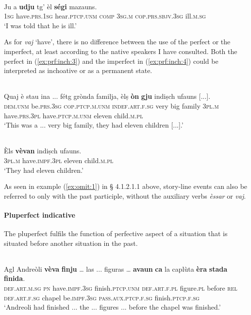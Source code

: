 \ea
\label{ex:prf:inch2}
\\
\gll Ju a \textbf{udju} tg' èl \textbf{ségi} mazauns.\\
\textsc{1sg} have.\textsc{prs.1sg} hear.\textsc{ptcp.unm} \textsc{comp} \textsc{3sg.m} \textsc{cop.prs.sbjv.3sg} ill.\textsc{m.sg}\\
\glt `I was told that he is ill.'
\z

As for \textit{vaj} `have', there is no difference between the use of the perfect or the imperfect, at least according to the native speakers I have consulted. Both the perfect in (\ref{ex:prf:inch:3}) and the imperfect in (\ref{ex:prf:inch:4}) could be interpreted as inchoative or as a permanent state.

\ea
\label{ex:prf:inch:3}
\\
\gll Quaj è stau ina ... fétg grònda familja, èlṣ \textbf{òn} \textbf{gju} indiṣch ufauns [...].\\
\textsc{dem.unm}  be.\textsc{prs.3sg}  \textsc{cop.ptcp.m.unm}  \textsc{indef.art.f.sg} {} very big family \textsc{3pl.m} have.\textsc{prs.3pl} have.\textsc{ptcp.m.unm} eleven child.\textsc{m.pl}\\
\glt `This was a ... very big family, they had eleven children [...].'
\z

\ea
\label {ex:prf:inch:4}
\\
\gll Èls \textbf{vèvan} indiṣch ufauns.\\
\textsc{3pl.m} have.\textsc{impf.3pl} eleven child.\textsc{m.pl}\\
\glt `They had eleven children.'
\z

As seen in example (\ref{ex:omit:1}) in § 4.1.2.1.1  above, story-line events can also be referred to only with the past participle, without the auxiliary verbs \textit{èssar} or \textit{vaj}.


\paragraph{Pluperfect indicative}
The pluperfect fulfils the function of perfective aspect of a situation that is situated before another situation in the past.

\ea
\label{}
\\
\gll  Agl Andreòli \textbf{vèva} \textbf{finju} … las ... figuras … \textbf{avaun} \textbf{ca} la caplùta \textbf{èra} \textbf{stada} \textbf{finida}. \\
\textsc{def.art.m.sg} \textsc{pn} have.\textsc{impf.3sg} finish.\textsc{ptcp.unm} {} \textsc{def.art.f.pl} {} figure.\textsc{pl} {} before \textsc{rel} \textsc{def.art.f.sg} chapel be.\textsc{impf.3sg} \textsc{pass.aux.ptcp.f.sg} finish.\textsc{ptcp.f.sg} \\
\glt `Andreoli had finished ... the ... figures ... before the chapel was finished.'
\z

